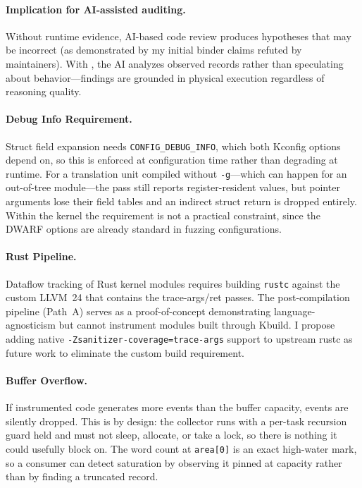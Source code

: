 \documentclass{article}
\begin{document}
\paragraph{Implication for AI-assisted auditing.} Without runtime evidence,
AI-based code review produces hypotheses that may be incorrect (as demonstrated
by my initial binder claims refuted by maintainers). With \toolname{}, the AI
analyzes observed records rather than speculating about behavior---findings are
grounded in physical execution regardless of reasoning quality.

\paragraph{Debug Info Requirement.} Struct field expansion needs
\texttt{CONFIG\_DEBUG\_INFO}, which both Kconfig options depend on, so this is
enforced at configuration time rather than degrading at runtime. For a
translation unit compiled without \texttt{-g}---which can happen for an
out-of-tree module---the pass still reports register-resident values, but
pointer arguments lose their field tables and an indirect struct return is
dropped entirely. Within the kernel the requirement is not a practical
constraint, since the DWARF options are already standard in fuzzing
configurations.

\paragraph{Rust Pipeline.} Dataflow tracking of Rust kernel modules requires
building \texttt{rustc} against the custom LLVM~24 that contains the
trace-args/ret passes. The post-compilation pipeline (Path~A) serves as a
proof-of-concept demonstrating language-agnosticism but cannot instrument
modules built through Kbuild. I propose adding native
\texttt{-Zsanitizer-coverage=trace-args} support to upstream rustc as future
work to eliminate the custom build requirement.

\paragraph{Buffer Overflow.} If instrumented code generates more events than
the buffer capacity, events are silently dropped. This is by design: the
collector runs with a per-task recursion guard held and must not sleep,
allocate, or take a lock, so there is nothing it could usefully block on. The
word count at \texttt{area[0]} is an exact high-water mark, so a consumer can
detect saturation by observing it pinned at capacity rather than by finding a
truncated record.
\end{document}
